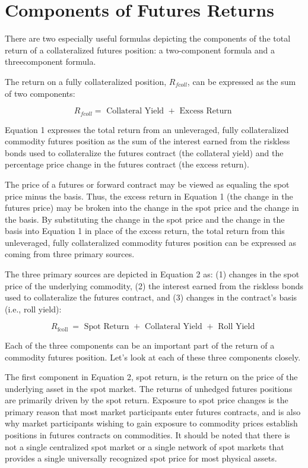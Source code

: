 \documentclass[11pt]{article}
\begin{document}
\section*{Components of Futures Returns}
There are two especially useful formulas depicting the components of the total return of a collateralized futures position: a two-component formula and a threecomponent formula.

The return on a fully collateralized position, $R_{f c o l l}$, can be expressed as the sum of two components:


\begin{equation*}
R_{f c o l l}=\text { Collateral Yield }+ \text { Excess Return } \tag{1}
\end{equation*}


Equation 1 expresses the total return from an unleveraged, fully collateralized commodity futures position as the sum of the interest earned from the riskless bonds used to collateralize the futures contract (the collateral yield) and the percentage price change in the futures contract (the excess return).

The price of a futures or forward contract may be viewed as equaling the spot price minus the basis. Thus, the excess return in Equation 1 (the change in the futures price) may be broken into the change in the spot price and the change in the basis. By substituting the change in the spot price and the change in the basis into Equation 1 in place of the excess return, the total return from this unleveraged, fully collateralized commodity futures position can be expressed as coming from three primary sources.

The three primary sources are depicted in Equation 2 as: (1) changes in the spot price of the underlying commodity, (2) the interest earned from the riskless bonds used to collateralize the futures contract, and (3) changes in the contract's basis (i.e., roll yield):


\begin{equation*}
R_{\text {fcoll }}=\text { Spot Return }+ \text { Collateral Yield }+ \text { Roll Yield } \tag{2}
\end{equation*}


Each of the three components can be an important part of the return of a commodity futures position. Let's look at each of these three components closely.

The first component in Equation 2, spot return, is the return on the price of the underlying asset in the spot market. The returns of unhedged futures positions are primarily driven by the spot return. Exposure to spot price changes is the primary reason that most market participants enter futures contracts, and is also why market participants wishing to gain exposure to commodity prices establish positions in futures contracts on commodities. It should be noted that there is not a single centralized spot market or a single network of spot markets that provides a single universally recognized spot price for most physical assets.
\end{document}
